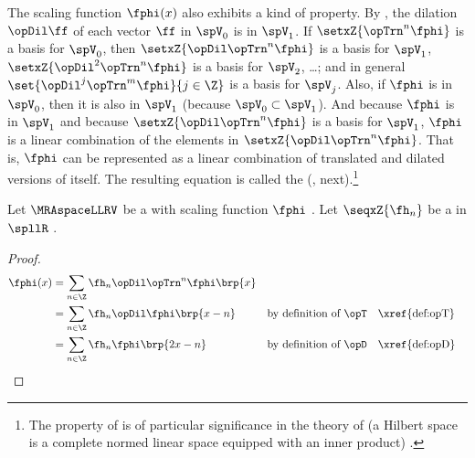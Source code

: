 The scaling function $\fphi(x)$  also exhibits a kind of  property.
By , the dilation $\opDil\ff$ of each vector $\ff$ in $\spV_0$ is in $\spV_1$.
If $\setxZ{\opTrn^n\fphi}$ is a basis for $\spV_0$,
then $\setxZ{\opDil\opTrn^n\fphi}$ is a basis for $\spV_1$,
$\setxZ{\opDil^2\opTrn^n\fphi}$ is a basis for $\spV_2$, \ldots;
and in general $\set{\opDil^j\opTrn^m\fphi}{j\in\Z}$ is a basis for $\spV_j$.
Also, if $\fphi$ is in $\spV_0$, then it is also in $\spV_1$ (because $\spV_0\subset\spV_1$).
And because $\fphi$ is in $\spV_1$ and because $\setxZ{\opDil\opTrn^n\fphi}$ is a basis for $\spV_1$,
$\fphi$ is a linear combination of the elements in $\setxZ{\opDil\opTrn^n\fphi}$.
That is, $\fphi$ can be represented as a linear combination of translated and dilated versions of itself.
The resulting equation is called the  (, next).\footnote{%
The property of  is of particular significance in the theory of
 (a Hilbert space is a complete normed linear space equipped with an inner product)%
.
}

\begin{definition}
\label{def:dilation_eq}
Let $\MRAspaceLLRV$ be a  with scaling function $\fphi$ .
Let $\seqxZ{\fh_n}$ be a   in $\spllR$ .
\end{definition}

\begin{remark}
\end{remark}
\begin{proof}
  \begin{align*}
    \fphi(x)
      &= \sum_{n\in\Z} \fh_n \opDil \opTrn^n \fphi\brp{x}
    \\&= \sum_{n\in\Z} \fh_n \opDil \fphi\brp{x-n}
      && \text{by definition of $\opT$} && \text{\xref{def:opT}}
    \\&= \sum_{n\in\Z} \fh_n \fphi\brp{2x-n}
      && \text{by definition of $\opD$} && \text{\xref{def:opD}}
  \end{align*}
\end{proof}

